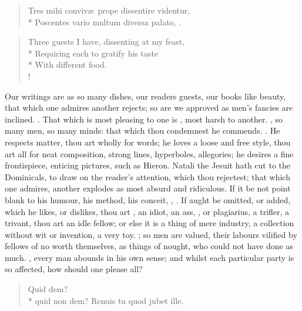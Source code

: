 {\begin{verse}
\textlatin{Tres mihi conviv\ae{}\ prope dissentire videntur},\\*
\textlatin{Poscentes vario multum diversa palato, \etc.}
\end{verse}

\begin{verse}
Three guests I have, dissenting at my feast,\\*
Requiring each to gratify his taste\\*
With different food.\\!
\end{verse}

Our writings are as so many dishes, our readers guests, our books like
beauty, that which one admires another rejects; so are we approved as
men's fancies are inclined. . That which is most pleasing to one is , most
harsh to another. , so many men, so many
minds: that which thou condemnest he commends. . He respects matter, thou art wholly for
words; he loves a loose and free style, thou art all for neat
composition, strong lines, hyperboles, allegories; he desires a fine
frontispiece, enticing pictures, such as Hieron. Natali the Jesuit
hath cut to the Dominicals, to draw on the reader's attention, which
thou rejectest; that which one admires, another explodes as most absurd
and ridiculous. If it be not point blank to his humour, his method, his
conceit, , \etc. If aught be omitted, or added, which he likes, or
dislikes, thou art , an idiot, an ass, , or plagiarius, a trifler, a trivant, thou art an idle fellow; or
else it is a thing of mere industry, a collection without wit or
invention, a very toy. ; so men are valued, their
labours vilified by fellows of no worth themselves, as things of
nought, who could not have done as much. ,
every man abounds in his own sense; and whilst each particular party is
so affected, how should one please all?

\begin{verse}
\textlatin{Quid dem?}\\*
\textlatin{quid non dem? Renuis tu quod jubet ille.}
\end{verse}

}
